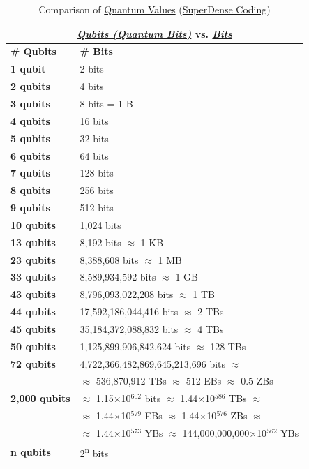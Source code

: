 \documentclass[conference]{IEEEtran}
\begin{document}
\begin{table}[!hp]
\centering
    \caption{Comparison of \href{https://en.wikipedia.org/wiki/Quantum}{Quantum Values} (\href{https://en.wikipedia.org/wiki/Superdense_coding}{SuperDense Coding})}
    \begin{tabular}{ |p{1.6cm}|p{6.2cm}| }
     \hline
     \multicolumn{2}{|c|}{\textbf{\href{https://en.wikipedia.org/wiki/Qubit}{\textit{Qubits (Quantum Bits)}} vs. \href{https://en.wikipedia.org/wiki/Bit}{\textit{Bits}}}} \\
     \hline
     \hline
     \textbf{\# Qubits} & \textbf{\# Bits}\\
     \hline
     \hline
     \textbf{1 qubit} & 2 bits \\
     \hline
     \textbf{2 qubits} & 4 bits \\
     \hline
     \textbf{3 qubits} & 8 bits = 1 B \\
     \hline
     \textbf{4 qubits} & 16 bits \\
     \hline
     \textbf{5 qubits} & 32 bits \\
     \hline
     \textbf{6 qubits} & 64 bits \\
     \hline
     \textbf{7 qubits} & 128 bits \\
     \hline
     \textbf{8 qubits} & 256 bits \\
     \hline
     \textbf{9 qubits} & 512 bits \\
     \hline
     \textbf{10 qubits} & 1,024 bits \\
     \hline
     \textbf{13 qubits} & 8,192 bits $\approx$ 1 KB \\
     \hline
     \textbf{23 qubits} & 8,388,608 bits $\approx$ 1 MB \\
     \hline
     \textbf{33 qubits} & 8,589,934,592 bits $\approx$ 1 GB \\
     \hline
     \textbf{43 qubits} & 8,796,093,022,208 bits $\approx$ 1 TB \\
     \hline
     \textbf{44 qubits} & 17,592,186,044,416 bits $\approx$ 2 TBs \\
     \hline
     \textbf{45 qubits} & 35,184,372,088,832 bits $\approx$ 4 TBs \\
     \hline
     \textbf{50 qubits} & 1,125,899,906,842,624 bits $\approx$ 128 TBs \\
     \hline
     \hline
     \textbf{72 qubits} & 4,722,366,482,869,645,213,696 bits $\approx$ \\ & 
     $\approx$ 536,870,912 TBs $\approx$ 512 EBs $\approx$ 0.5 ZBs \\
     \hline
     \textbf{2,000 qubits} & $\approx$ 1.15$\times$10$^{602}$ ‬bits $\approx$ 1.44$\times$10$^{586}$ TBs $\approx$ \\ & $\approx$ 1.44$\times$10$^{579}$ EBs $\approx$ 1.44$\times$10$^{576}$ ZBs $\approx$ \\ & $\approx$ 1.44$\times$10$^{573}$ YBs $\approx$ 144,000,000,000$\times$10$^{562}$ YBs\\
     \hline
     \hline
     \textbf{n qubits} & 2\textsuperscript{n} bits \\
     \hline
    \end{tabular}
\end{table}
\end{document}
